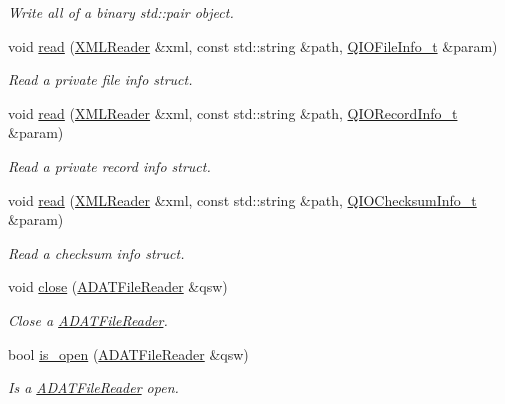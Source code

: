 \begin{DoxyCompactItemize}
\begin{DoxyCompactList}\small\item\em Write all of a binary std\+::pair object. \end{DoxyCompactList}\item 
void \mbox{\hyperlink{namespaceADATIO_ac8ef7ea6a40421510ad5578b6fad884e}{read}} (\mbox{\hyperlink{classADATXML_1_1XMLReader}{X\+M\+L\+Reader}} \&xml, const std\+::string \&path, \mbox{\hyperlink{structADATIO_1_1QIOFileInfo__t}{Q\+I\+O\+File\+Info\+\_\+t}} \&param)
\begin{DoxyCompactList}\small\item\em Read a private file info struct. \end{DoxyCompactList}\item 
void \mbox{\hyperlink{namespaceADATIO_ac5827e268402afb3a0bb4ebbcec97706}{read}} (\mbox{\hyperlink{classADATXML_1_1XMLReader}{X\+M\+L\+Reader}} \&xml, const std\+::string \&path, \mbox{\hyperlink{structADATIO_1_1QIORecordInfo__t}{Q\+I\+O\+Record\+Info\+\_\+t}} \&param)
\begin{DoxyCompactList}\small\item\em Read a private record info struct. \end{DoxyCompactList}\item 
void \mbox{\hyperlink{namespaceADATIO_ab39e59b5ba8a584a1c5afd164173b9e7}{read}} (\mbox{\hyperlink{classADATXML_1_1XMLReader}{X\+M\+L\+Reader}} \&xml, const std\+::string \&path, \mbox{\hyperlink{structADATIO_1_1QIOChecksumInfo__t}{Q\+I\+O\+Checksum\+Info\+\_\+t}} \&param)
\begin{DoxyCompactList}\small\item\em Read a checksum info struct. \end{DoxyCompactList}\item 
void \mbox{\hyperlink{group__qio_gac32c771b58d87e4ef4af62a7ad2e5c0d}{close}} (\mbox{\hyperlink{classADATIO_1_1ADATFileReader}{A\+D\+A\+T\+File\+Reader}} \&qsw)
\begin{DoxyCompactList}\small\item\em Close a \mbox{\hyperlink{classADATIO_1_1ADATFileReader}{A\+D\+A\+T\+File\+Reader}}. \end{DoxyCompactList}\item 
bool \mbox{\hyperlink{group__qio_gad9b8cab72f011dd46c24a51e8a1c756a}{is\+\_\+open}} (\mbox{\hyperlink{classADATIO_1_1ADATFileReader}{A\+D\+A\+T\+File\+Reader}} \&qsw)
\begin{DoxyCompactList}\small\item\em Is a \mbox{\hyperlink{classADATIO_1_1ADATFileReader}{A\+D\+A\+T\+File\+Reader}} open. \end{DoxyCompactList}\item 

\end{DoxyCompactItemize}
